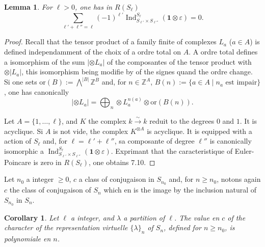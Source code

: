 \documentclass[11pt,a4paper]{article}
\theoremstyle{plain}
\newtheorem{lemma}[theorem]{Lemma}
\newtheorem{corollary}[theorem]{Corollary}
\theoremstyle{definition}
\DeclareMathOperator{\Ind}{Ind}
\newcommand{\Z}{\mathbb{Z}}
\newcommand{\eps}{\varepsilon}
\newcommand{\isom}{\xrightarrow{\sim}}
\begin{document}
\begin{lemma}
For $\ell > 0$, one has in $R(S_\ell)$
\[
\sum_{\ell' + \ell'' = \ell} (-1)^{\ell'} \Ind_{S_{\ell'} \times S_{\ell''}}^{S_\ell}(\mathbf{1} \otimes \eps) = 0.
\]
\end{lemma}

\begin{proof}
Recall that the tensor product of a family finite of complexes $L_a$ ($a \in A$) is defined independamment of the choix of a ordre total on $A$. A ordre total defines a isomorphism of the sum $|\otimes L_a|$ of the composantes of the tensor product with $\otimes |L_a|$, this isomorphism being modifie by of the signes quand the ordre change. Si one sets $\text{or}(B) := \bigwedge^{|B|} \Z^B$ and, for $n \in \Z^A$, $B(n) := \{a \in A \mid n_a \text{ est impair}\}$, one has canonically
\[
|\otimes L_a| = \bigoplus_n \otimes L_a^{n(a)} \otimes \text{or}(B(n)).
\]

Let $A = \{1, \ldots, \ell\}$, and $K$ the complex $k \isom k$ reduit to the degrees $0$ and $1$. It is acyclique. Si $A$ is not vide, the complex $K^{\otimes A}$ is acyclique. It is equipped with a action of $S_\ell$ and, for $\ell = \ell' + \ell''$, sa composante of degree $\ell''$ is canonically isomorphic a $\Ind_{S_{\ell'} \times S_{\ell''}}^{S_\ell}(\mathbf{1} \otimes \eps)$. Exprimant that the caracteristique of Euler-Poincare is zero in $R(S_\ell)$, one obtains 7.10.
\end{proof}

Let $n_0$ a integer $\geq 0$, $c$ a class of conjugaison in $S_{n_0}$ and, for $n \geq n_0$, notons again $c$ the class of conjugaison of $S_n$ which en is the image by the inclusion natural of $S_{n_0}$ in $S_n$.

\begin{corollary}
Let $\ell$ a integer, and $\lambda$ a partition of $\ell$. The value en $c$ of the character of the representation virtuelle $\{\lambda\}_n$ of $S_n$, defined for $n \geq n_0$, is polynomiale en $n$.
\end{corollary}
\end{document}
